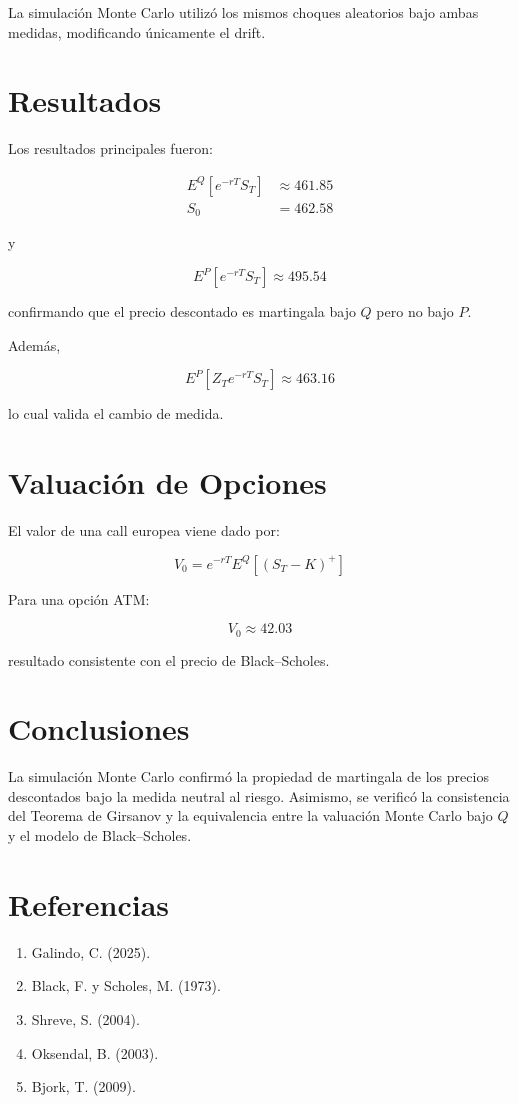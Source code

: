 \documentclass[12pt]{article}
\begin{document}
La simulación Monte Carlo utilizó los mismos choques aleatorios bajo ambas medidas, modificando únicamente el drift.

\section{Resultados}

Los resultados principales fueron:

\begin{align}
E^Q[e^{-rT}S_T] &\approx 461.85 \\
S_0 &= 462.58
\end{align}

y

\begin{equation}
E^P[e^{-rT}S_T]\approx495.54
\end{equation}

confirmando que el precio descontado es martingala bajo $Q$ pero no bajo $P$.

Además,

\begin{equation}
E^P[Z_T e^{-rT}S_T]\approx463.16
\end{equation}

lo cual valida el cambio de medida.

\section{Valuación de Opciones}

El valor de una call europea viene dado por:

\begin{equation}
V_0=e^{-rT}E^Q[(S_T-K)^+]
\end{equation}

Para una opción ATM:

\begin{equation}
V_0 \approx 42.03
\end{equation}

resultado consistente con el precio de Black--Scholes.

\section{Conclusiones}

La simulación Monte Carlo confirmó la propiedad de martingala de los precios descontados bajo la medida neutral al riesgo. Asimismo, se verificó la consistencia del Teorema de Girsanov y la equivalencia entre la valuación Monte Carlo bajo $Q$ y el modelo de Black--Scholes.

\section{Referencias}

\begin{enumerate}
\item Galindo, C. (2025).
\item Black, F. y Scholes, M. (1973).
\item Shreve, S. (2004).
\item Oksendal, B. (2003).
\item Bjork, T. (2009).
\end{enumerate}
\end{document}
